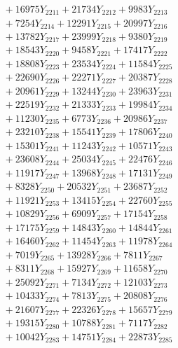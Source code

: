 \documentclass[a4paper,10pt]{article}
\begin{document}
{\begin{align}
&\;  + 16975 Y_{2211} + 21734 Y_{2212} + 9983 Y_{2213} \\[0.3ex]
&\;  + 7254 Y_{2214} + 12291 Y_{2215} + 20997 Y_{2216} \\[0.3ex]
&\;  + 13782 Y_{2217} + 23999 Y_{2218} + 9380 Y_{2219} \\[0.5ex]\allowbreak
&\;  + 18543 Y_{2220} + 9458 Y_{2221} + 17417 Y_{2222} \\[0.3ex]
&\;  + 18808 Y_{2223} + 23534 Y_{2224} + 11584 Y_{2225} \\[0.3ex]
&\;  + 22690 Y_{2226} + 22271 Y_{2227} + 20387 Y_{2228} \\[0.3ex]
&\;  + 20961 Y_{2229} + 13244 Y_{2230} + 23963 Y_{2231} \\[0.3ex]
&\;  + 22519 Y_{2232} + 21333 Y_{2233} + 19984 Y_{2234} \\[0.3ex]
&\;  + 11230 Y_{2235} + 6773 Y_{2236} + 20986 Y_{2237} \\[0.3ex]
&\;  + 23210 Y_{2238} + 15541 Y_{2239} + 17806 Y_{2240} \\[0.3ex]
&\;  + 15301 Y_{2241} + 11243 Y_{2242} + 10571 Y_{2243} \\[0.3ex]
&\;  + 23608 Y_{2244} + 25034 Y_{2245} + 22476 Y_{2246} \\[0.3ex]
&\;  + 11917 Y_{2247} + 13968 Y_{2248} + 17131 Y_{2249} \\[0.5ex]\allowbreak
&\;  + 8328 Y_{2250} + 20532 Y_{2251} + 23687 Y_{2252} \\[0.3ex]
&\;  + 11921 Y_{2253} + 13415 Y_{2254} + 22760 Y_{2255} \\[0.3ex]
&\;  + 10829 Y_{2256} + 6909 Y_{2257} + 17154 Y_{2258} \\[0.3ex]
&\;  + 17175 Y_{2259} + 14843 Y_{2260} + 14844 Y_{2261} \\[0.3ex]
&\;  + 16460 Y_{2262} + 11454 Y_{2263} + 11978 Y_{2264} \\[0.3ex]
&\;  + 7019 Y_{2265} + 13928 Y_{2266} + 7811 Y_{2267} \\[0.3ex]
&\;  + 8311 Y_{2268} + 15927 Y_{2269} + 11658 Y_{2270} \\[0.3ex]
&\;  + 25092 Y_{2271} + 7134 Y_{2272} + 12103 Y_{2273} \\[0.3ex]
&\;  + 10433 Y_{2274} + 7813 Y_{2275} + 20808 Y_{2276} \\[0.3ex]
&\;  + 21607 Y_{2277} + 22326 Y_{2278} + 15657 Y_{2279} \\[0.5ex]\allowbreak
&\;  + 19315 Y_{2280} + 10788 Y_{2281} + 7117 Y_{2282} \\[0.3ex]
&\;  + 10042 Y_{2283} + 14751 Y_{2284} + 22873 Y_{2285} \\[0.3ex]

\end{align}}
\end{document}
